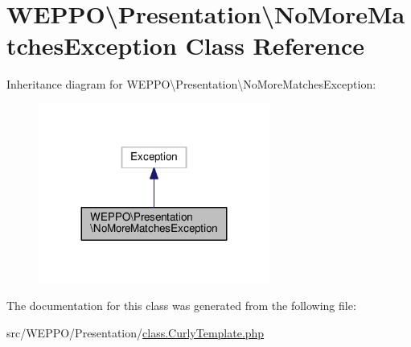 \hypertarget{classWEPPO_1_1Presentation_1_1NoMoreMatchesException}{}\section{W\+E\+P\+PO\textbackslash{}Presentation\textbackslash{}No\+More\+Matches\+Exception Class Reference}
\label{classWEPPO_1_1Presentation_1_1NoMoreMatchesException}


Inheritance diagram for W\+E\+P\+PO\textbackslash{}Presentation\textbackslash{}No\+More\+Matches\+Exception\+:\nopagebreak
\begin{figure}[H]
\begin{center}
\leavevmode
\includegraphics[width=215pt]{classWEPPO_1_1Presentation_1_1NoMoreMatchesException__inherit__graph}
\end{center}
\end{figure}


The documentation for this class was generated from the following file\+:\begin{DoxyCompactItemize}
\item 
src/\+W\+E\+P\+P\+O/\+Presentation/\hyperlink{class_8CurlyTemplate_8php}{class.\+Curly\+Template.\+php}\end{DoxyCompactItemize}
